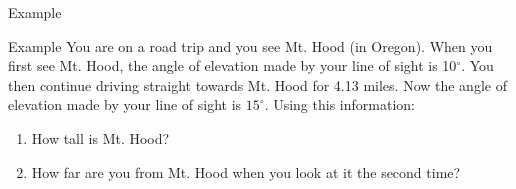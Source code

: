 \documentclass[presentation]{beamer}
\begin{document}
\begin{frame}[label={sec:orgcb38228}]{Example}
\end{frame}

\begin{frame}[label={sec:orgd0898a1}]{Example}
You are on a road trip and you see Mt. Hood (in Oregon).  When you
first see Mt. Hood, the angle of elevation made by your line of sight
is 10\(^{\circ}.\) You then continue driving straight towards Mt. Hood
for 4.13 miles.  Now the angle of elevation made by your line of sight
is \(15^{\circ}\).  Using this information:
\begin{enumerate}
\item How tall is Mt. Hood?
\item How far are you from Mt. Hood when you look at it the second time?
\end{enumerate}

\vspace{10in}   
\end{frame}
\end{document}

